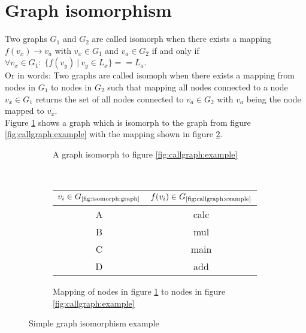 \documentclass[
    12pt,                               %
    DIV=14,                     %
    parskip=half+,              %
    bigheadings,                %
    cleardoubleempty,   %
    halfparskip,                %
    ]{scrreprt} %
\begin{document}
\section{Graph isomorphism}
Two graphs $G_1$ and $G_2$ are called isomorph when there exists a mapping $f(v_x) \rightarrow v_a$ with $v_x \in G_1$ and $v_a \in G_2$ if and only if $\forall v_x \in G_1: \; \{f(v_y) \: | \: v_y \in L_x\} == L_a$. \\
Or in words: Two graphs are called isomoph when there exists a mapping from nodes in $G_1$ to nodes in $G_2$ such that mapping all nodes connected to a node $v_x \in G_1$ returns the set of all nodes connected to $v_a \in G_2$ with $v_a$ being the node mapped to $v_x$. \\
Figure \ref{fig:isomorph:graph} shows a graph which is isomorph to the graph from figure \ref{fig:callgraph:example} with the mapping shown in figure \ref{fig:isomorph:mapping}.

\begin{figure}[H]
        \centering
        \begin{subfigure}[b]{0.45\textwidth}
                \centering
                \caption{A graph isomorph to figure \ref{fig:callgraph:example}}
                \label{fig:isomorph:graph}
        \end{subfigure}
        ~
        \begin{subfigure}[b]{0.45\textwidth}
                \centering
				\begin{tabular}{c | c}
					$v_i \in G_{\text{\ref{fig:isomorph:graph}}}$ & $f(v_i) \in G_{\text{\ref{fig:callgraph:example}}}$ \\
					\hline
					A & calc \\
					B & mul \\
					C & main \\
					D & add \\
				\end{tabular}
                \caption{Mapping of nodes in figure \ref{fig:isomorph:graph} to nodes in figure \ref{fig:callgraph:example}}
                \label{fig:isomorph:mapping}
        \end{subfigure}

        \caption{Simple graph isomorphism example}
        \label{fig:isomorph}
\end{figure}
\end{document}
